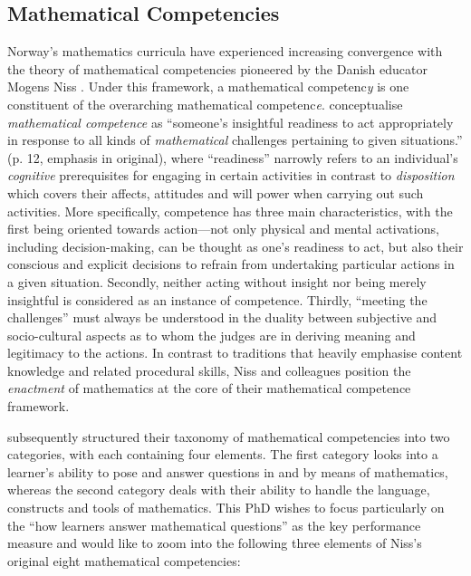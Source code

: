 \documentclass[
    a4paper,                %
    11pt,                   %
    stu,                    %
    donotrepeattitle,       %
    floatsintext,           %
    biblatex,               %
    colorlinks=true,        %
    linkcolor=red,          %
    anchorcolor=black,      %
    citecolor=blue,         %
    urlcolor=blue,          %
    bookmarks=true,         %
    bookmarksopen=false,    %
    bookmarksnumbered=true, %
    dvipsnames              %
]{apa7}
\begin{document}
\subsection{Mathematical Competencies}

Norway's mathematics curricula have experienced increasing convergence with the theory of mathematical competencies pioneered by the Danish educator Mogens Niss \parencite{niss:2003,niss:2011,niss:2019}. Under this framework, a mathematical competenc\emph{y} is one constituent of the overarching mathematical competenc\emph{e}. \textcite{niss:2019} conceptualise \emph{mathematical competence} as ``someone's insightful readiness to act appropriately in response to all kinds of \emph{mathematical} challenges pertaining to given situations.'' (p. 12, emphasis in original), where ``readiness'' narrowly refers to an individual's \emph{cognitive} prerequisites for engaging in certain activities in contrast to \emph{disposition} which covers their affects, attitudes and will power when carrying out such activities. More specifically, competence has three main characteristics, with the first being oriented towards action---not only physical and mental activations, including decision-making, can be thought as one's readiness to act, but also their conscious and explicit decisions to refrain from undertaking particular actions in a given situation. Secondly, neither acting without insight nor being merely insightful is considered as an instance of competence. Thirdly, ``meeting the challenges'' must always be understood in the duality between subjective and socio-cultural aspects as to whom the judges are in deriving meaning and legitimacy to the actions. In contrast to traditions that heavily emphasise content knowledge and related procedural skills, Niss and colleagues position the \emph{enactment} of mathematics at the core of their mathematical competence framework.

\textcite{niss:2019} subsequently structured their taxonomy of mathematical competencies into two categories, with each containing four elements. The first category looks into a learner's ability to pose and answer questions in and by means of mathematics, whereas the second category deals with their ability to handle the language, constructs and tools of mathematics. This PhD wishes to focus particularly on the ``how learners answer mathematical questions'' as the key performance measure and would like to zoom into the following three elements of Niss's original eight mathematical competencies:
\end{document}
